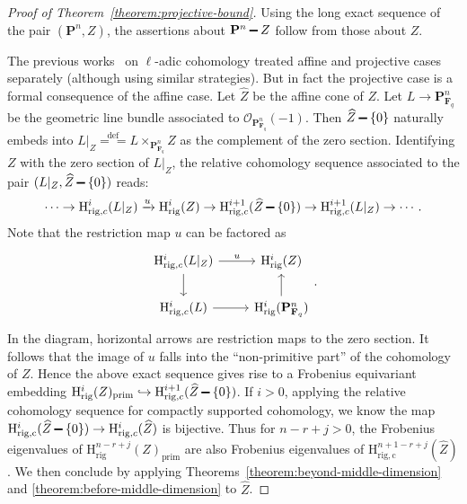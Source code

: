 \documentclass{amsart}
\numberwithin{equation}{section}
\theoremstyle{plain}
\theoremstyle{definition}
\renewcommand{\mathbb}{\mathbf}
\renewcommand{\setminus}{\mathbin{\rule[0.2em]{0.67em}{0.12em}}}%
\begin{document}
\begin{proof}[Proof of Theorem~\ref{theorem:projective-bound}]
Using the long exact sequence of the pair \((\mathbb{P}^{n},Z)\),
the assertions about \(\mathbb{P}^n\setminus Z\) follow from those about \(Z\).

The previous
works~\cite{esnault-katz:cohomological-divisibility,esnault-wan:divisibility}
on \(\ell\)-adic cohomology treated affine and projective cases separately
(although using similar strategies). But in fact the projective
case is a formal consequence of the affine case.
Let \(\widehat{Z}\) be the affine cone of \(Z\). Let \(L \to \mathbb{P}^n_{\mathbb{F}_q}\) be the
geometric line bundle associated to \(\mathcal{O}_{\mathbb{P}^{n}_{\mathbb{F}_q}}(-1)\).
Then \(\widehat{Z}\setminus\{0\}\) naturally embeds into
\(L|_Z \overset{\text{def}}{=\!=} L \times_{\mathbb{P}^n_{\mathbb{F}_q}} Z\) as the
complement of the zero section. Identifying \(Z\) with the zero section of
\(L|_Z\), the relative cohomology sequence associated
to the pair \((L|_Z,\widehat{Z}\setminus\{0\})\) reads:
\begin{equation*}
  \cdots
  \to \mathrm{H}^{i}_{\mathrm{rig},c}(L|_Z) \xrightarrow{u} \mathrm{H}^{i}_{\mathrm{rig}}(Z) \to
  \mathrm{H}^{i+1}_{\mathrm{rig},c}(\widehat{Z}\setminus \{0\})
  \to \mathrm{H}^{i+1}_{\mathrm{rig},c}(L|_Z) \to \cdots.
\end{equation*}
Note that the restriction map \(u\) can be factored as
\begin{equation*}
\begin{tikzcd}
\mathrm{H}^{i}_{\mathrm{rig},c}(L|_Z) \ar[r,"u"] \ar[d] & \mathrm{H}^{i}_{\mathrm{rig}}(Z) \\
\mathrm{H}^{i}_{\mathrm{rig},c}(L) \ar[r] & \mathrm{H}^{i}_{\mathrm{rig}}(\mathbb{P}^n_{\mathbb{F}_q}) \ar[u]
\end{tikzcd}.
\end{equation*}
In the diagram, horizontal arrows are restriction maps to the zero section.
It follows that the image of \(u\) falls into the ``non-primitive part'' of the
cohomology of \(Z\). Hence the above exact sequence gives rise to a Frobenius
equivariant embedding
\(\mathrm{H}^{i}_{\mathrm{rig}}(Z)_{\mathrm{prim}} \hookrightarrow\mathrm{H}^{i+1}_{\mathrm{rig},c}(\widehat{Z} \setminus\{0\})\).
If \(i>0\), applying the relative cohomology sequence for compactly supported
cohomology, we know the map
\(\mathrm{H}^{i}_{\mathrm{rig,c}}(\widehat{Z}\setminus\{0\}) \to \mathrm{H}^{i}_{\mathrm{rig},c}(\widehat{Z})\)
is bijective. Thus for \(n-r+j > 0\), the Frobenius eigenvalues of
\(\mathrm{H}_{\mathrm{rig}}^{n-r+j}(Z)_{\mathrm{prim}}\) are also
Frobenius eigenvalues of \(\mathrm{H}^{n+1-r+j}_{\mathrm{rig,c}}(\widehat{Z})\).
We then conclude by applying Theorems~\ref{theorem:beyond-middle-dimension} and
\ref{theorem:before-middle-dimension} to \(\widehat{Z}\).
\end{proof}
\end{document}
